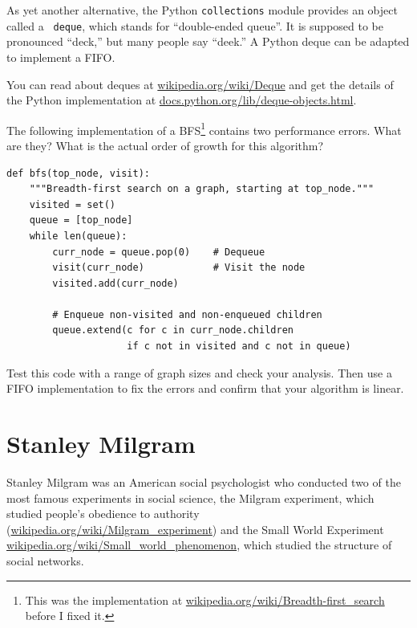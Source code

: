 \documentclass[10pt]{book}
\begin{document}
As yet another alternative,
the Python {\tt collections} module provides an object called a {\tt
  deque}, which stands for ``double-ended queue''.  It is supposed to
be pronounced ``deck,'' but many people say ``deek.''  A Python deque
can be adapted to implement a FIFO.

You can read about deques at \url{wikipedia.org/wiki/Deque}
and get the details of the Python implementation at
\url{docs.python.org/lib/deque-objects.html}.


\begin{exercise}

The following implementation of a BFS\footnote{This was the
  implementation at \url{wikipedia.org/wiki/Breadth-first_search}
  before I fixed it.}  contains two performance errors.  What are
they?  What is the actual order of growth for this algorithm?

\begin{verbatim}
def bfs(top_node, visit):
    """Breadth-first search on a graph, starting at top_node."""
    visited = set()
    queue = [top_node]
    while len(queue):
        curr_node = queue.pop(0)    # Dequeue
        visit(curr_node)            # Visit the node
        visited.add(curr_node)

        # Enqueue non-visited and non-enqueued children
        queue.extend(c for c in curr_node.children
                     if c not in visited and c not in queue)
\end{verbatim}

Test this code with a range of graph sizes and check your analysis.
Then use a FIFO implementation to fix the errors and confirm
that your algorithm is linear.

\end{exercise}


\section{Stanley Milgram}

Stanley Milgram was an American social psychologist who conducted
two of the most famous experiments in social science, the
Milgram experiment, which studied people's obedience to authority
(\url{wikipedia.org/wiki/Milgram_experiment})
and the Small World Experiment
\url{wikipedia.org/wiki/Small_world_phenomenon}, which studied
the structure of social networks.
\end{document}
